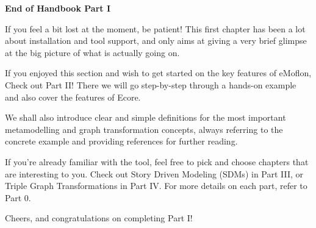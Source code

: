 \newpage
\noHeader

\vspace*{2cm}

{\bf \large End of Handbook Part I }
\vspace{0.5cm}

If you feel a bit lost at the moment, be patient! This first chapter has been a lot about installation and tool support, and only aims at giving a very brief glimpse at the big picture of what is actually going on.  

If you enjoyed this section and wish to get started on the key features of eMoflon, Check out Part II! There we will go step-by-step through a hands-on example and also cover the features of Ecore.

We shall also introduce clear and simple definitions for the most important metamodelling and graph transformation concepts, always referring to the concrete example and providing references for further reading.

If you're already familiar with the tool, feel free to pick and choose chapters that are interesting to you. Check out Story Driven Modeling (SDMs) in Part III, or Triple Graph Transformations in Part IV. For more details on each part, refer to Part 0.

Cheers, and congratulations on completing Part I!

\newpage
\mbox{}